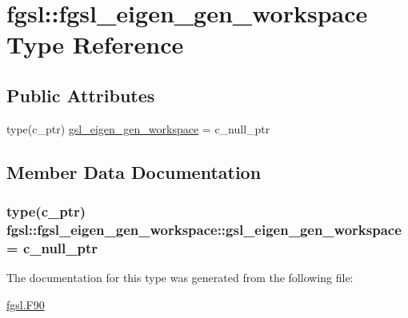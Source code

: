 \hypertarget{structfgsl_1_1fgsl__eigen__gen__workspace}{\section{fgsl\-:\-:fgsl\-\_\-eigen\-\_\-gen\-\_\-workspace Type Reference}
\label{structfgsl_1_1fgsl__eigen__gen__workspace}
}
\subsection*{Public Attributes}
\begin{DoxyCompactItemize}
\item 
type(c\-\_\-ptr) \hyperlink{structfgsl_1_1fgsl__eigen__gen__workspace_aa6b6ff281fc9afaf2b7caeeb4ba444fc}{gsl\-\_\-eigen\-\_\-gen\-\_\-workspace} = c\-\_\-null\-\_\-ptr
\end{DoxyCompactItemize}


\subsection{Member Data Documentation}
\hypertarget{structfgsl_1_1fgsl__eigen__gen__workspace_aa6b6ff281fc9afaf2b7caeeb4ba444fc}{
\subsubsection[{gsl\-\_\-eigen\-\_\-gen\-\_\-workspace}]{\setlength{\rightskip}{0pt plus 5cm}type(c\-\_\-ptr) fgsl\-::fgsl\-\_\-eigen\-\_\-gen\-\_\-workspace\-::gsl\-\_\-eigen\-\_\-gen\-\_\-workspace = c\-\_\-null\-\_\-ptr}}\label{structfgsl_1_1fgsl__eigen__gen__workspace_aa6b6ff281fc9afaf2b7caeeb4ba444fc}


The documentation for this type was generated from the following file\-:\begin{DoxyCompactItemize}
\item 
\hyperlink{fgsl_8F90}{fgsl.\-F90}\end{DoxyCompactItemize}
